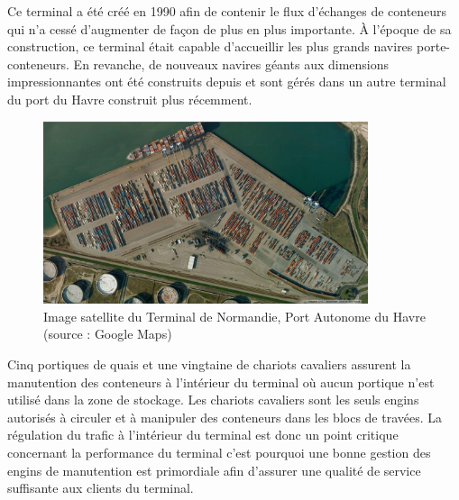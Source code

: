 Ce terminal a été créé en 1990 afin de contenir le flux d'échanges de conteneurs qui n'a cessé d'augmenter de façon de plus en plus importante. À l'époque de sa construction, ce terminal était capable d'accueillir les plus grands navires porte-conteneurs. En revanche, de nouveaux navires géants aux dimensions impressionnantes ont été construits depuis et sont gérés dans un autre terminal du port du Havre construit plus récemment.

\begin{figure}[ht]
  \begin{center}
    \includegraphics[width=0.85\textwidth]{chapitres/application/terminalDeNormandieGoogleMaps.jpg}
    \caption{Image satellite du Terminal de Normandie, Port Autonome du Havre (source : Google Maps)}
    \label{fig:TNGoogle}
 \end{center}
\end{figure}

Cinq portiques de quais et une vingtaine de chariots cavaliers assurent la manutention des conteneurs à l'intérieur du terminal où aucun portique n'est utilisé dans la zone de stockage. Les chariots cavaliers sont les seuls engins autorisés à circuler et à manipuler des conteneurs dans les blocs de travées. La régulation du trafic à l'intérieur du terminal est donc un point critique concernant la performance du terminal c'est pourquoi une bonne gestion des engins de manutention est primordiale afin d'assurer une qualité de service suffisante aux clients du terminal.\\


